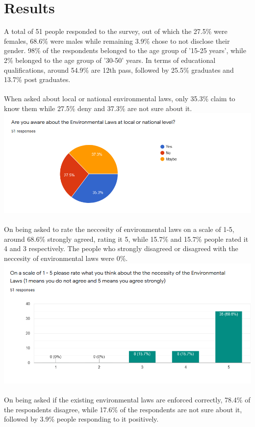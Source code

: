 \documentclass[12pt]{article}
\begin{document}
\section{Results}
A total of 51 people responded to the survey, out of which the 27.5\% were females, 68.6\% were males while remaining 3.9\% chose to not disclose their gender. 
98\% of the respondents belonged to the age group of '15-25 years', while 2\% belonged to the age group of '30-50' years. In terms of educational qualifications, around 
54.9\% are 12th pass, followed by 25.5\% graduates and 13.7\% post graduates. 
\\ \\ \noindent
When asked about local or national environmental laws, only 35.3\% claim to know them while 27.5\% deny and 37.3\% are not sure about it.
\\
\includegraphics[scale=1]{1}
 \\ \\ 
 On being asked to rate the neccesity of environmental laws on a scale of 1-5, around 68.6\% strongly agreed, rating it 5, while 15.7\% and 15.7\% people rated it 4 and 3 respectively. 
 The people who strongly disagreed  or disagreed with the neccesity of environmental laws were 0\%. 
\\ 
\includegraphics[scale=0.7]{2}
\\ \\
On being asked if the existing environmental laws are enforced correctly, 78.4\% of the respondents disagree, while 17.6\% of the respondents are not sure about it, followed by 3.9\% people responding to it positively.
\end{document}
